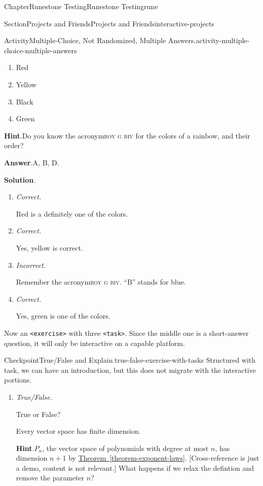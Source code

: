 \documentclass[oneside,10pt,]{book}
\newcommand{\blocktitlefont}{\relax}
\newcommand{\xreffont}{\relax}
\newcommand{\mono}[1]{\texttt{#1}}
\newcommand{\acronym}[1]{\textsc{\MakeLowercase{#1}}}
\newcommand{\lititle}[1]{{\slshape#1}}
\numberwithin{equation}{section}
\begin{document}
\begin{chapterptx}{Chapter}{Runestone Testing}{}{Runestone Testing}{}{}{rune}
\begin{sectionptx}{Section}{Projects and Friends}{}{Projects and Friends}{}{}{interactive-projects}
\begin{activity}{Activity}{Multiple-Choice, Not Randomized, Multiple Answers.}{activity-multiple-choice-multiple-answers}
\begin{enumerate}[label={\Alph*.}]
\item{}Red%
\item{}Yellow%
\item{}Black%
\item{}Green%
\end{enumerate}
%
\par\smallskip%
\noindent\textbf{\blocktitlefont Hint}.\hypertarget{activity-multiple-choice-multiple-answers-4}{}\quad{}Do you know the acronym\textellipsis{}\acronym{ROY G BIV} for the colors of a rainbow, and their order?%
\par\smallskip%
\noindent\textbf{\blocktitlefont Answer}.\hypertarget{activity-multiple-choice-multiple-answers-5}{}\quad{}A, B, D.%
\par\smallskip%
\noindent\textbf{\blocktitlefont Solution}.\hypertarget{activity-multiple-choice-multiple-answers-6}{}\quad{}%
\begin{enumerate}[label={\Alph*.}]
\item{}\lititle{Correct.}\par%
Red is a definitely one of the colors.%
\item{}\lititle{Correct.}\par%
Yes, yellow is correct.%
\item{}\lititle{Incorrect.}\par%
Remember the acronym\textellipsis{}\acronym{ROY G BIV}.  ``B'' stands for blue.%
\item{}\lititle{Correct.}\par%
Yes, green is one of the colors.%
\end{enumerate}
%
\end{activity}%
Now an \mono{<exercise>} with three \mono{<task>}.  Since the middle one is a short-answer question, it will only be interactive on a capable platform.%
\begin{inlineexercise}{Checkpoint}{True\slash{}False and Explain.}{true-false-exercise-with-tasks}%
Structured with task, we can have an introduction, but this does not migrate with the interactive portions.%
\begin{enumerate}[font=\bfseries,label=(\alph*),ref=\alph*]%
\item{}\lititle{True\slash{}False.}\par%
True or False?%
\par
Every vector space has finite dimension.%
\par\smallskip%
\noindent\textbf{\blocktitlefont Hint}.\hypertarget{true-false-task-4}{}\quad{}\(P_n\), the vector space of polynomials with degree at most \(n\), has dimension \(n+1\) by \hyperref[theorem-exponent-laws]{Theorem~{\xreffont\ref{theorem-exponent-laws}}}.  [Cross-reference is just a demo, content is not relevant.]  What happens if we relax the defintion and remove the parameter \(n\)?%

\end{enumerate}
\end{inlineexercise}
\end{sectionptx}
\end{chapterptx}
\end{document}
